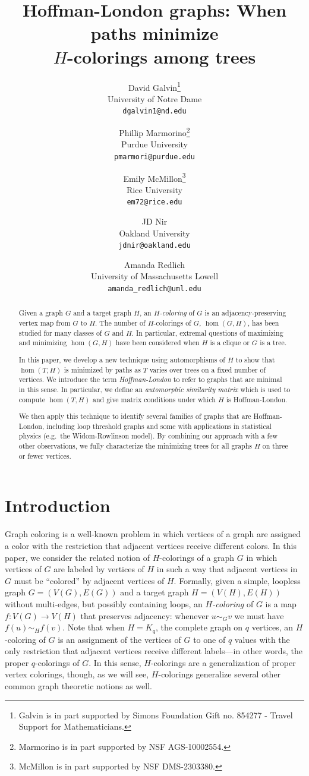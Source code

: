 \documentclass[11pt]{article}
\title{Hoffman-London graphs: When paths minimize\\ $H$-colorings among trees}
\author{
David Galvin\thanks{Galvin is in part supported by Simons Foundation Gift no. 854277 - Travel Support for Mathematicians.}\\
University of Notre Dame\\
{\tt dgalvin1@nd.edu}
\and
Phillip Marmorino\thanks{Marmorino is in part supported by NSF AGS-10002554.}\\
Purdue University\\
{\tt pmarmori@purdue.edu}
\and
Emily McMillon\thanks{McMillon is in part supported by NSF DMS-2303380.}\\
Rice University\\
{\tt em72@rice.edu}
\and
JD Nir\\
Oakland University\\
{\tt jdnir@oakland.edu}
\and
Amanda Redlich\\
University of Massachusetts Lowell\\
{\tt amanda\_redlich@uml.edu}
}
\theoremstyle{definition}
\begin{document}
\maketitle

\begin{abstract}
Given a graph $G$ and a target graph $H$, an \textit{$H$-coloring} of $G$ is an adjacency-preserving vertex map from $G$ to $H$. The number of $H$-colorings of $G$, $\hom(G,H)$, has been studied for many classes of $G$ and $H$. In particular, extremal questions of maximizing and minimizing $\hom(G,H)$ have been considered when $H$ is a clique or $G$ is a tree.

In this paper, we develop a new technique using automorphisms of $H$ to show that $\hom(T,H)$ is minimized by paths as $T$ varies over trees on a fixed number of vertices. We introduce the term \emph{Hoffman-London} to refer to graphs that are minimal in this sense. 
In particular, we define an \textit{automorphic similarity matrix} which is used to compute $\hom(T,H)$ and give matrix conditions under which $H$ is Hoffman-London.  

We then apply this technique to identify several families of graphs that are Hoffman-London, including loop threshold graphs and some with applications in statistical physics (e.g.~the Widom-Rowlinson model). By combining our approach with a few other observations, we fully characterize the minimizing trees for all graphs $H$ on three or fewer vertices.
\end{abstract}

\section{Introduction} \label{sec:introduction}

Graph coloring is a well-known problem in which vertices of a graph are assigned a color with the restriction that adjacent vertices receive different colors. In this paper, we consider the related notion of $H$-colorings of a graph $G$ in which vertices of $G$ are labeled by vertices of $H$ in such a way that adjacent vertices in $G$ must be ``colored'' by adjacent vertices of $H$. Formally, given a simple, loopless graph $G = (V(G), E(G))$ and a target graph $H = (V(H),E(H))$ without multi-edges, but possibly containing loops, an \emph{$H$-coloring} of $G$ is a map $f: V(G) \to V(H)$ that preserves adjacency: whenever $u \sim_G v$ we must have $f(u) \sim_H f(v)$. Note that when $H= K_q$, the complete graph on $q$ vertices, an $H$-coloring of $G$ is an assignment of the vertices of $G$ to one of $q$ values with the only restriction that adjacent vertices receive different labels---in other words, the proper $q$-colorings of $G$. In this sense, $H$-colorings are a generalization of proper vertex colorings, though, as we will see, $H$-colorings generalize several other common graph theoretic notions as well.
\end{document}
